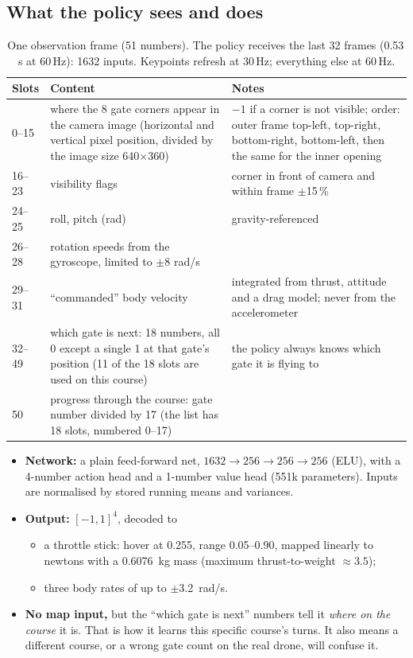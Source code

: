 \documentclass[10pt,a4paper]{article}
\begin{document}
\subsection{What the policy sees and does}\label{sec:obs}
\begin{table}[H]\centering\small
\begin{tabularx}{\linewidth}{@{}lXX@{}}
\toprule
Slots & Content & Notes \\
\midrule
0--15 & where the 8 gate corners appear in the camera image (horizontal and vertical pixel position, divided by the image size 640$\times$360) & $-1$ if a corner is not visible; order: outer frame top-left, top-right, bottom-right, bottom-left, then the same for the inner opening \\
16--23 & visibility flags & corner in front of camera and within frame $\pm$15\,\% \\
24--25 & roll, pitch (rad) & gravity-referenced \\
26--28 & rotation speeds from the gyroscope, limited to $\pm$8 rad/s & \\
29--31 & ``commanded'' body velocity & integrated from thrust, attitude and a drag model; never from the accelerometer \\
32--49 & which gate is next: 18 numbers, all 0 except a single 1 at that gate's position (11 of the 18 slots are used on this course) & the policy always knows which gate it is flying to \\
50 & progress through the course: gate number divided by 17 (the list has 18 slots, numbered 0--17) & \\
\bottomrule
\end{tabularx}
\caption{One observation frame (51 numbers). The policy receives the last 32 frames (0.53\,s at 60\,Hz): 1632 inputs. Keypoints refresh at 30\,Hz; everything else at 60\,Hz.}
\end{table}

\begin{explain}
\begin{itemize}
\item \textbf{Network:} a plain feed-forward net, $1632 \rightarrow 256 \rightarrow 256 \rightarrow 256$ (ELU), with a 4-number action head and a 1-number value head (551k parameters). Inputs are normalised by stored running means and variances.
\item \textbf{Output:} $[-1,1]^4$, decoded to
  \begin{itemize}
  \item a throttle stick: hover at 0.255, range 0.05--0.90, mapped linearly to newtons with a \SI{0.6076}{kg} mass (maximum thrust-to-weight $\approx3.5$);
  \item three body rates of up to $\pm$\SI{3.2}{rad/s}.
  \end{itemize}
\item \textbf{No map input,} but the ``which gate is next'' numbers tell it \emph{where on the course} it is. That is how it learns this specific course's turns. It also means a different course, or a wrong gate count on the real drone, will confuse it.
\end{itemize}
\end{explain}
\end{document}
